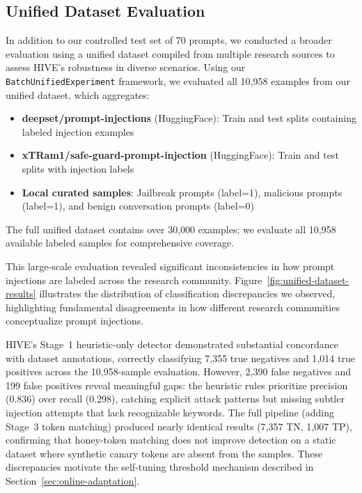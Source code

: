 \documentclass[manuscript,screen,review]{acmart}
\begin{document}
\subsection{Unified Dataset Evaluation}
In addition to our controlled test set of 70 prompts, we conducted a broader evaluation using a unified dataset compiled from multiple research sources to assess HIVE's robustness in diverse scenarios.\label{sec:unified-eval} Using our \texttt{BatchUnifiedExperiment} framework, we evaluated all 10{,}958 examples from our unified dataset, which aggregates:
\begin{itemize}
\item \textbf{deepset/prompt-injections} (HuggingFace): Train and test splits containing labeled injection examples
\item \textbf{xTRam1/safe-guard-prompt-injection} (HuggingFace): Train and test splits with injection labels
\item \textbf{Local curated samples}: Jailbreak prompts (label=1), malicious prompts (label=1), and benign conversation prompts (label=0)
\end{itemize}

The full unified dataset contains over 30{,}000 examples; we evaluate all 10{,}958 available labeled samples for comprehensive coverage.


This large-scale evaluation revealed significant inconsistencies in how prompt injections are labeled across the research community. Figure~\ref{fig:unified-dataset-results} illustrates the distribution of classification discrepancies we observed, highlighting fundamental disagreements in how different research communities conceptualize prompt injections.

HIVE's Stage~1 heuristic-only detector demonstrated substantial concordance with dataset annotations, correctly classifying 7{,}355 true negatives and 1{,}014 true positives across the 10{,}958-sample evaluation. However, 2{,}390 false negatives and 199 false positives reveal meaningful gaps: the heuristic rules prioritize precision (0.836) over recall (0.298), catching explicit attack patterns but missing subtler injection attempts that lack recognizable keywords. The full pipeline (adding Stage~3 token matching) produced nearly identical results (7{,}357 TN, 1{,}007 TP), confirming that honey-token matching does not improve detection on a static dataset where synthetic canary tokens are absent from the samples. These discrepancies motivate the self-tuning threshold mechanism described in Section~\ref{sec:online-adaptation}.
\end{document}
